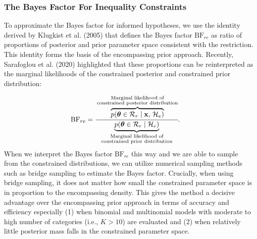 \documentclass[
  english,
  man,floatsintext]{apa6}
\begin{document}
\hypertarget{the-bayes-factor-for-inequality-constraints}{%
\subsubsection{The Bayes Factor For Inequality Constraints}\label{the-bayes-factor-for-inequality-constraints}}

\noindent To approximate the Bayes factor for informed hypotheses, we use the identity derived by Klugkist et al. (2005) that defines the Bayes factor \(\text{BF}_{re}\) as ratio of proportions of posterior and prior parameter space consistent with the restriction. This identity forms the basis of the encompassing prior approach. Recently, Sarafoglou et al. (2020) highlighted that these proportions can be reinterpreted as the marginal likelihoods of the constrained posterior and constrained prior distribution:

\begin{align}
\label{Eq:klugkistIdentity}
\text{BF}_{re} &= \cfrac{\overbrace{p(\boldsymbol{\theta} \in \mathcal{R}_r \mid \mathbf{x}\text{, }\mathcal{H}_e)}^{\substack{\text{Marginal likelihood of}\\\text{constrained posterior distribution}}}}{\underbrace{p(\boldsymbol{\theta} \in \mathcal{R}_r \mid  \mathcal{H}_e)}_{\substack{\text{Marginal likelihood of}\\\text{constrained prior distribution}}}}.
\end{align}
When we interpret the Bayes factor \(\text{BF}_{re}\) this way and we are able to sample from the constrained distributions, we can utilize numerical sampling methods such as bridge sampling to estimate the Bayes factor. Crucially, when using bridge sampling, it does not matter how small the constrained parameter space is in proportion to the encompassing density. This gives the method a decisive advantage over the encompassing prior approach in terms of accuracy and efficiency especially (1) when binomial and multinomial models with moderate to high number of categories (i.e., \(K > 10\)) are evaluated and (2) when relatively little posterior mass falls in the constrained parameter space.
\end{document}
